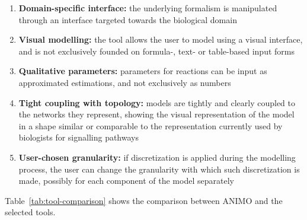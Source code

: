\documentclass{bmcart}
\begin{document}
\begin{enumerate}
  \item {\bf Domain-specific interface:} the underlying formalism is manipulated through an interface
      targeted towards the biological domain
  \item {\bf Visual modelling:} the tool allows the user to model using a visual interface, and is not exclusively
      founded on formula-, text- or table-based input forms
  \item {\bf Qualitative parameters:} parameters for reactions can be input as approximated estimations, and not exclusively as numbers
  \item {\bf Tight coupling with topology:} models are tightly and clearly coupled to the networks they represent, showing the visual
      representation of the model in a shape similar or comparable to the representation currently used by biologists
      for signalling pathways
  \item {\bf User-chosen granularity:} if discretization is applied during the modelling process, the user can change the granularity
      with which such discretization is made, possibly for each component of the model separately
\end{enumerate}
Table~\ref{tab:tool-comparison} shows the comparison between ANIMO and the selected tools.
\end{document}
